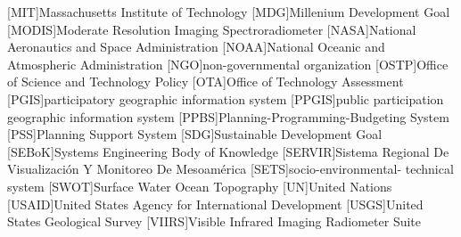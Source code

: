 \begin{acronym}[HyperLEAVES]
[MIT]{Massachusetts Institute of Technology}
[MDG]{Millenium Development Goal}
[MODIS]{Moderate Resolution Imaging Spectroradiometer}
[NASA]{National Aeronautics and Space Administration}
[NOAA]{National Oceanic and Atmospheric Administration}
[NGO]{non-governmental organization}
[OSTP]{Office of Science and Technology Policy}
[OTA]{Office of Technology Assessment}
[PGIS]{participatory geographic information system}
[PPGIS]{public participation geographic information system}
[PPBS]{Planning-Programming-Budgeting System}
[PSS]{Planning Support System}
[SDG]{Sustainable Development Goal}
[SEBoK]{Systems Engineering Body of Knowledge}
[SERVIR]{Sistema Regional De Visualizaci\'{o}n Y Monitoreo De Mesoam\'{e}rica}
[SETS]{socio-environmental-
technical system}
[SWOT]{Surface Water Ocean Topography}
[UN]{United Nations}
[USAID]{United States Agency for International Development}
[USGS]{United States Geological Survey}
[VIIRS]{Visible Infrared Imaging Radiometer Suite}





\end{acronym}

